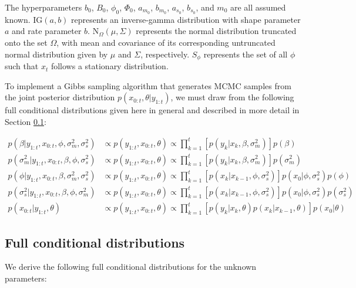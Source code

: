 \documentclass{article}
\begin{document}
\noindent The hyperparameters $b_0$, $B_0$, $\phi_0$, $\Phi_0$, $a_{m_0}$, $b_{m_0}$, $a_{s_0}$, $b_{s_0}$, and $m_0$ are all assumed known. $\mbox{IG}(a,b)$ represents an inverse-gamma distribution with shape parameter $a$ and rate parameter $b$. $\mbox{N}_{\Omega}(\mu, \Sigma)$ represents the normal distribution truncated onto the set $\Omega$, with mean and covariance of its corresponding untruncated normal distribution given by $\mu$ and $\Sigma$, respectively. $S_{\phi}$ represents the set of all $\phi$ such that $x_t$ follows a stationary distribution.

To implement a Gibbs sampling algorithm that generates MCMC samples from the joint posterior distribution $p(x_{0:t},\theta|y_{1:t})$, we must draw from the following full conditional distributions given here in general and described in more detail in Section  \ref{sec:fullcond}:

\begin{align*}
p(\beta|y_{1:t},x_{0:t},\phi,\sigma^2_m,\sigma^2_s) &\propto p(y_{1:t},x_{0:t},\theta) \propto \prod_{k=1}^t\left[p(y_k|x_k,\beta,\sigma^2_m)\right]p(\beta) \\
p(\sigma^2_m|y_{1:t},x_{0:t},\beta,\phi,\sigma^2_s) &\propto p(y_{1:t},x_{0:t},\theta) \propto \prod_{k=1}^t\left[p(y_k|x_k,\beta,\sigma^2_m)\right]p(\sigma^2_m) \\
p(\phi|y_{1:t},x_{0:t},\beta,\sigma^2_m,\sigma^2_s) &\propto p(y_{1:t},x_{0:t},\theta) \propto \prod_{k=1}^t\left[p(x_k|x_{k-1},\phi,\sigma^2_s)\right]p(x_0|\phi,\sigma^2_s)p(\phi) \\
p(\sigma^2_s|y_{1:t},x_{0:t},\beta,\phi,\sigma^2_m) &\propto p(y_{1:t},x_{0:t},\theta) \propto \prod_{k=1}^t\left[p(x_k|x_{k-1},\phi,\sigma^2_s)\right]p(x_0|\phi,\sigma^2_s)p(\sigma^2_s) \\
p(x_{0:t}|y_{1:t},\theta) &\propto p(y_{1:t},x_{0:t},\theta) \propto \prod_{k=1}^t\left[p(y_k|x_k,\theta)p(x_k|x_{k-1},\theta)\right]p(x_0|\theta)
\end{align*}

\subsection{Full conditional distributions} \label{sec:fullcond}

We derive the following full conditional distributions for the unknown parameters:
\end{document}
